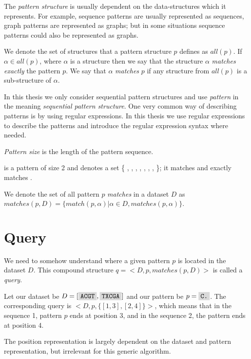 The \emph{pattern structure} is usually dependent on the data-structures which it represents. For example, sequence patterns are usually represented as sequences, graph patterns are represented as graphs; but in some situations sequence patterns could also be represented as graphs.

We denote the set of structures that a pattern structure $p$ defines as $all(p)$. If $\alpha \in all(p)$, where $\alpha$ is a structure then we say that the structure $\alpha$ \emph{matches exactly} the pattern $p$. We say that $\alpha$ \emph{matches} $p$ if any structure from $all(p)$ is a sub-structure of $\alpha$.

In this thesis we only consider sequential pattern structures and use \emph{pattern} in the meaning \emph{sequential pattern structure}. One very common way of describing patterns is by using regular expressions\cite{KleeneRegularSets,RegularExpressions}. In this thesis we use regular expressions to describe the patterns and introduce the regular expression syntax where needed.

\emph{Pattern size} is the length of the pattern sequence.

\begin{exmp}
 is a pattern of size 2 and denotes a set 
\{ , , , , , , , \}; it matches  and exactly matches .	
\end{exmp}

We denote the set of all pattern $p$ \emph{matches} in a dataset $D$ as $matches(p, D) = \{ match(p, \alpha) | \alpha \in D, matches(p, \alpha) \}$.

\section{Query}

We need to somehow understand where a given pattern $p$ is located in the dataset $D$. This compound structure $q = <D, p, matches(p, D)>$ is called a \emph{query}.

\begin{exmp}
Let our dataset be $D = [ \text{\R{ACGT}}, \text{\R{TXCGA}} ]$ and our pattern be $p = \text{\R{C.}}$. The corresponding query is $<D, p, \{ [1,3], [2,4]\}>$, which means that in the sequence 1, pattern $p$ ends at position 3, and in the sequence 2, the pattern ends at position 4.
\end{exmp}

The position representation is largely dependent on the dataset and pattern representation, but irrelevant for this generic algorithm.

